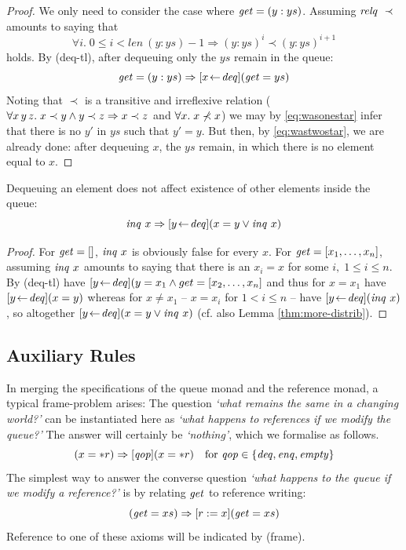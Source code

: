 \begin{proof}
  We only need to consider the case where $\mathit{get} = (y:ys)$. Assuming $\mathit{relq}~\prec$
  amounts to saying that
\begin{equation}\label{eq:wasonestar}
\forall i.\; 0\leq i<len\ (y:ys) -1 \Rightarrow (y:ys)^i \prec (y:ys)^{i+1}
\end{equation}
holds. By (deq-tl), after dequeuing only the $ys$ remain in the queue:
\begin{equation}\label{eq:wastwostar}
\mathit{get} = (y:ys) \Rightarrow [x \!\gets\! \mathit{deq}](\mathit{get} = ys)
\end{equation}
Noting that $\prec$ is a transitive and irreflexive relation (\IE $\forall x\,y\,z.\; x \prec
y \land y \prec z \Rightarrow x \prec z$ and $\forall x .\; x \not\prec x$) we may by \eqref{eq:wasonestar}
infer that there is no $y'$ in $ys$ such that $y' = y$. But then, by
\eqref{eq:wastwostar}, we are already done: after dequeuing $x$, the $ys$
remain, in which there is no element equal to $x$.
\end{proof}

\begin{lem}
\label{inq-deq-eq}
Dequeuing an element does not affect existence of other elements inside the queue: 
\[
\mathit{inq}~x \Rightarrow [y \!\gets\! \mathit{deq}](x = y \lor \mathit{inq}~x)
\]
\end{lem}

\begin{proof}
  For $\mathit{get} = []$, $\mathit{inq}~x$ is obviously false for every $x$.  For $\mathit{get} =
  [x_1,\ldots,x_n]$, assuming $\mathit{inq}~x$ amounts to saying that there is an $x_i = x$
  for some $i,\; 1\leq i\leq n$. By (deq-tl) have $[y \!\gets\! \mathit{deq}](y = x_1 \land get =
  [x_2,\ldots,x_n]$ and thus for $x = x_1$ have $[y \!\gets\! \mathit{deq}](x = y)$ whereas for
  $x \neq x_1$ -- \IE $x = x_i$ for $1 < i \leq n$ -- have $[y \!\gets\! \mathit{deq}](\mathit{inq}~x)$,
  so altogether $[y \!\gets\! \mathit{deq}](x = y \lor \mathit{inq}~x)$ (cf. also Lemma
  \ref{thm:more-distrib}).
\end{proof}

\subsection{Auxiliary Rules}
\label{sec:auxiliary-rules}

In merging the specifications of the queue monad and the reference monad, a
typical frame-problem arises: The question \emph{`what remains the same in a
  changing world?'} can be instantiated here as \emph{`what happens to
  references if we modify the queue?'} The answer will certainly be
\emph{`nothing'}, which we formalise as follows.
\begin{equation}
\label{eq:frame1}
(x = {\ast r}) \Rightarrow [\mathit{qop}](x = {\ast r}) \quad\text{for }\mathit{qop} \in \{\mathit{deq}, \mathit{enq}, \mathit{empty} \} 
\end{equation}
The simplest way to answer the converse question \emph{`what happens to the queue
if we modify a reference?'}  is by relating $\mathit{get}$ to reference writing:
\begin{equation}
\label{eq:frame2}
(\mathit{get} = xs) \Rightarrow [r := x](\mathit{get} = xs)
\end{equation}
Reference to one of these axioms will be indicated by (frame).

